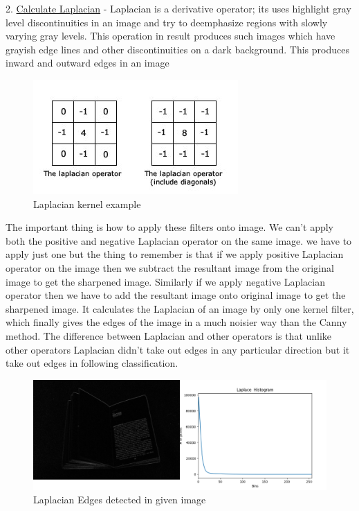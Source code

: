 \documentclass[BTech]{srmuthesis}
\begin{document}
2. \underline{Calculate Laplacian} - Laplacian is a derivative operator; its uses highlight gray level discontinuities in an image and try to deemphasize regions with slowly varying gray levels. This operation in result produces such images which have grayish edge lines and other discontinuities on a dark background. This produces inward and outward edges in an image

\begin{figure}[h!]
    \centering
    \includegraphics[width=12cm\textwidth]{laplacian-kernel}
    \caption{Laplacian kernel example}
    \label{fig:Laplacian kernel}
\end{figure}

The important thing is how to apply these filters onto image. We can't apply both the positive and negative Laplacian operator on the same image. we have to apply just one but the thing to remember is that if we apply positive Laplacian operator on the image then we subtract the resultant image from the original image to get the sharpened image. Similarly if we apply negative Laplacian operator then we have to add the resultant image onto original image to get the sharpened image.
It calculates the Laplacian  of an image by only one kernel filter, which finally gives the edges of the image in a much noisier way than the Canny method. The difference between Laplacian and other operators is that unlike other operators Laplacian didn't take out edges in any particular direction but it take out edges in following classification.

\begin{figure}[h!]
    \centering
    \includegraphics[width=15cm\textwidth]{laplace_hist}
    \caption{Laplacian Edges detected in given image}
    \label{fig:Laplacian Edges detected in given image}
\end{figure}
\end{document}
